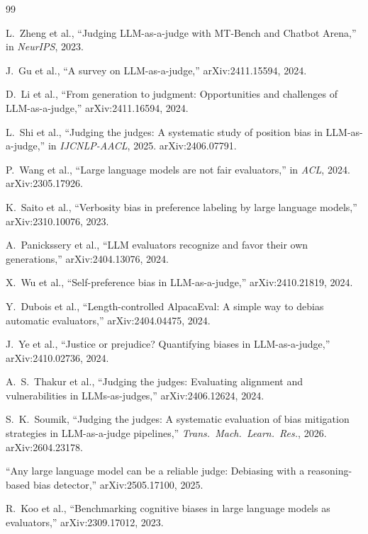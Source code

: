 \documentclass{article}
\begin{document}

\begin{thebibliography}{99}

L.~Zheng et al., ``Judging LLM-as-a-judge with MT-Bench and Chatbot
Arena,'' in \emph{NeurIPS}, 2023.

J.~Gu et al., ``A survey on LLM-as-a-judge,'' arXiv:2411.15594, 2024.

D.~Li et al., ``From generation to judgment: Opportunities and
challenges of LLM-as-a-judge,'' arXiv:2411.16594, 2024.

L.~Shi et al., ``Judging the judges: A systematic study of position
bias in LLM-as-a-judge,'' in \emph{IJCNLP-AACL}, 2025.
arXiv:2406.07791.

P.~Wang et al., ``Large language models are not fair evaluators,''
in \emph{ACL}, 2024. arXiv:2305.17926.

K.~Saito et al., ``Verbosity bias in preference labeling by large
language models,'' arXiv:2310.10076, 2023.

A.~Panickssery et al., ``LLM evaluators recognize and favor their
own generations,'' arXiv:2404.13076, 2024.

X.~Wu et al., ``Self-preference bias in LLM-as-a-judge,''
arXiv:2410.21819, 2024.

Y.~Dubois et al., ``Length-controlled AlpacaEval: A simple way to
debias automatic evaluators,'' arXiv:2404.04475, 2024.

J.~Ye et al., ``Justice or prejudice? Quantifying biases in
LLM-as-a-judge,'' arXiv:2410.02736, 2024.

A.~S.~Thakur et al., ``Judging the judges: Evaluating alignment and
vulnerabilities in LLMs-as-judges,'' arXiv:2406.12624, 2024.

S.~K.~Soumik, ``Judging the judges: A systematic evaluation of bias
mitigation strategies in LLM-as-a-judge pipelines,'' \emph{Trans.\
Mach.\ Learn.\ Res.}, 2026. arXiv:2604.23178.

``Any large language model can be a reliable judge: Debiasing with a
reasoning-based bias detector,'' arXiv:2505.17100, 2025.

R.~Koo et al., ``Benchmarking cognitive biases in large language
models as evaluators,'' arXiv:2309.17012, 2023.


\end{thebibliography}
\end{document}
